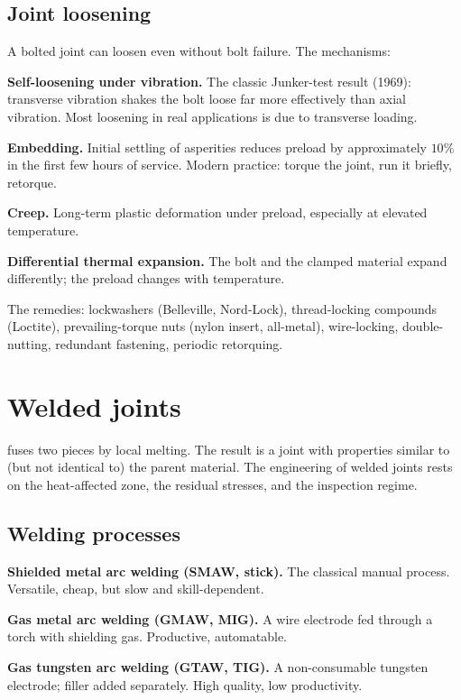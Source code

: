 \subsection{Joint loosening}

A bolted joint can loosen even without bolt failure. The mechanisms:

\textbf{Self-loosening under vibration.} The classic Junker-test result (1969): transverse vibration shakes the bolt loose far more effectively than axial vibration. Most loosening in real applications is due to transverse loading.

\textbf{Embedding.} Initial settling of asperities reduces preload by approximately $10\%$ in the first few hours of service. Modern practice: torque the joint, run it briefly, retorque.

\textbf{Creep.} Long-term plastic deformation under preload, especially at elevated temperature.

\textbf{Differential thermal expansion.} The bolt and the clamped material expand differently; the preload changes with temperature.

The remedies: lockwashers (Belleville, Nord-Lock), thread-locking compounds (Loctite), prevailing-torque nuts (nylon insert, all-metal), wire-locking, double-nutting, redundant fastening, periodic retorquing.

\section{Welded joints}

 fuses two pieces by local melting. The result is a joint with properties similar to (but not identical to) the parent material. The engineering of welded joints rests on the heat-affected zone, the residual stresses, and the inspection regime.

\subsection{Welding processes}

\textbf{Shielded metal arc welding (SMAW, stick).} The classical manual process. Versatile, cheap, but slow and skill-dependent.

\textbf{Gas metal arc welding (GMAW, MIG).} A wire electrode fed through a torch with shielding gas. Productive, automatable.

\textbf{Gas tungsten arc welding (GTAW, TIG).} A non-consumable tungsten electrode; filler added separately. High quality, low productivity.

